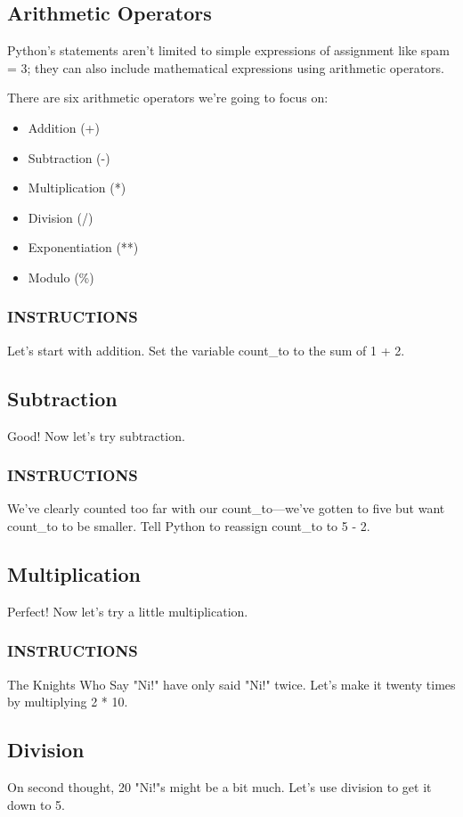 \documentclass[12pt,a4paper,final,twoside,onecolumn,titlepage]{book}
\begin{document}
\subsection{Arithmetic Operators}
Python's statements aren't limited to simple expressions of assignment like spam = 3; they can also include mathematical expressions using arithmetic operators.

There are six arithmetic operators we're going to focus on:
\begin{itemize}
\item Addition (+)
\item Subtraction (-)
\item Multiplication (*)
\item Division (/)
\item Exponentiation (**)
\item Modulo (\%)
\end{itemize}

\subsubsection{INSTRUCTIONS}
Let's start with addition. Set the variable count\_to to the sum of 1 + 2.

\subsection{Subtraction}
Good! Now let's try subtraction.

\subsubsection{INSTRUCTIONS}
We've clearly counted too far with our count\_to—we've gotten to five but want count\_to to be smaller. Tell Python to reassign count\_to to 5 - 2.

\subsection{Multiplication}
Perfect! Now let's try a little multiplication.

\subsubsection{INSTRUCTIONS}
The Knights Who Say "Ni!" have only said "Ni!" twice. Let's make it twenty times by multiplying 2 * 10.

\subsection{Division}
On second thought, 20 "Ni!"s might be a bit much. Let's use division to get it down to 5.
\end{document}
